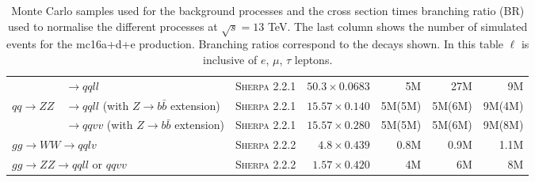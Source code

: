 \begin{table}[tbph]
{\begin{tabular}{lllrrrr}
                                            & $\rightarrow qqll$ & \textsc{Sherpa 2.2.1} & $50.3\times0.0683$ & 5M & 27M & 9M \\
    $qq\rightarrow ZZ$ & $\rightarrow qqll$ (with $Z\rightarrow b\bar{b}$ extension) & \textsc{Sherpa 2.2.1} & $15.57\times0.140$ & 5M(5M)  & 5M(6M) & 9M(4M) \\
                                            & $\rightarrow qqvv$ (with $Z\rightarrow b\bar{b}$ extension) & \textsc{Sherpa 2.2.1} & $15.57\times0.280$ & 5M(5M)  & 5M(6M) & 9M(8M) \\ \hline
    \multicolumn{2}{l}{$gg\rightarrow WW \rightarrow qqlv$} & \textsc{Sherpa 2.2.2} & $4.8\times0.439$ & 0.8M & 0.9M & 1.1M \\
    \multicolumn{2}{l}{$gg\rightarrow ZZ \rightarrow qqll$ or $qqvv$} & \textsc{Sherpa 2.2.2} & $1.57\times0.420$ & 4M & 6M & 8M \\ \hline
    \bottomrule
  \end{tabular}
}
\caption{Monte Carlo samples used for the background processes and the cross section times branching ratio (BR) used to normalise the different 
processes at $\sqrt{s}=13$ TeV. The last column shows the number of simulated events for the {mc16a+d+e} production.
Branching ratios correspond to the decays shown.  In this table $\ell$ is inclusive of $e$, $\mu$, $\tau$ leptons.
}
\label{tbl:bkgMC}
\end{table}
